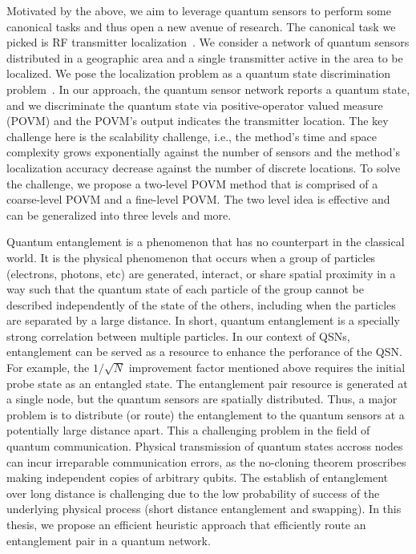 Motivated by the above, we aim to leverage quantum sensors to perform some canonical tasks and thus open a new avenue of research.
The canonical task we picked is RF transmitter localization~\cite{nsdi13-arraytrack,pmc22-deepmtlpro}.
We consider a network of quantum sensors distributed in a geographic area and a single transmitter active in the area to be localized.
We pose the localization problem as a quantum state discrimination problem~\cite{bergou-review-2007}. 
In our approach, the quantum sensor network reports a quantum state, and we discriminate the quantum state via 
positive-operator valued measure (POVM) and the POVM's output indicates the transmitter location.
The key challenge here is the scalability challenge, i.e., the method's time and space complexity grows exponentially against the
number of sensors and the method's localization accuracy decrease against the number of discrete locations.
To solve the challenge, we propose a two-level POVM method that is comprised of a coarse-level POVM and a fine-level POVM.
The two level idea is effective and can be generalized into three levels and more.

Quantum entanglement is a phenomenon that has no counterpart in the classical world.
It is the physical phenomenon that occurs when a group of particles (electrons, photons, etc) are generated, interact, or share spatial proximity in a way such that
the quantum state of each particle of the group cannot be described independently of the state of the others, including when the particles
are separated by a large distance.
In short, quantum entanglement is a specially strong correlation between multiple particles.
In our context of QSNs, entanglement can be served as a resource to enhance the perforance of the QSN.
For example, the $1 / \sqrt{N}$ improvement factor mentioned above requires the initial probe state as an entangled state.
The entanglement pair resource is generated at a single node, but the quantum sensors are spatially distributed.
Thus, a major problem is to distribute (or route) the entanglement to the quantum sensors at a potentially large distance apart.
This a challenging problem in the field of quantum communication.
Physical transmission of quantum states accross nodes can incur irreparable communication errors, as the no-cloning theorem proscribes
making independent copies of arbitrary qubits.
The establish of entanglement over long distance is challenging due to the low probability of success of the underlying physical process
(short distance entanglement and swapping).
In this thesis, we propose an efficient heuristic approach that efficiently route an entanglement pair in a quantum network.

